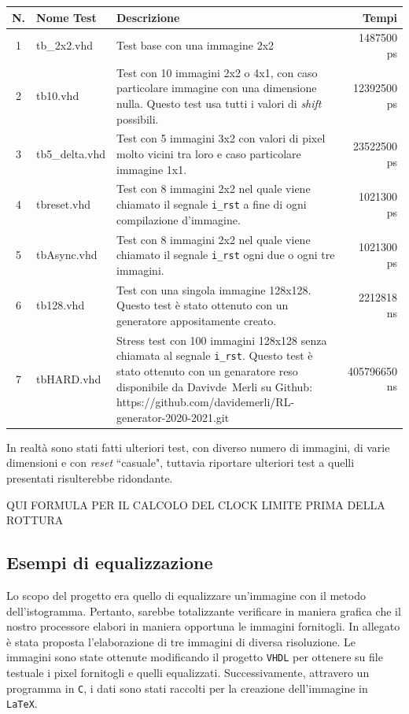\documentclass[11pt, a4paper]{article}
\begin{document}
\begin{center}
  \begin{tabular}{|c|l|p{8.5cm}|r|}
    \hline
    N. &Nome Test & Descrizione & Tempi\\
    \hline
    1 & tb\_2x2.vhd & Test base con una immagine 2x2 & 1487500 ps \\
    \hline
    2 & tb10.vhd & Test con 10 immagini 2x2 o 4x1, con caso particolare immagine con una dimensione nulla. Questo test usa tutti i valori di \textit{shift} possibili.&12392500 ps\\
    \hline
    3 & tb5\_delta.vhd & Test con 5 immagini 3x2 con valori di pixel molto vicini tra loro e caso particolare immagine 1x1. & 23522500 ps\\
    \hline
    4 & tbreset.vhd & Test con 8 immagini 2x2 nel quale viene chiamato il segnale \texttt{i\_rst} a fine di ogni compilazione d'immagine. & 1021300 ps\\
    \hline
    5 & tbAsync.vhd & Test con 8 immagini 2x2 nel quale viene chiamato il segnale \texttt{i\_rst} ogni due o ogni tre immagini. & 1021300 ps\\
    \hline
    6& tb128.vhd & Test con una singola immagine 128x128. Questo test è stato ottenuto con un generatore appositamente creato. & 2212818 ns\\
    \hline
    7 & tbHARD.vhd & Stress test con 100 immagini 128x128 senza chiamata al segnale \texttt{i\_rst}. Questo test è stato ottenuto con un genaratore reso disponibile da \mbox{Davivde Merli} su Github: https://github.com/davidemerli/RL-generator-2020-2021.git & 405796650 ns\\
    \hline
  \end{tabular}
\end{center}
In realtà sono stati fatti ulteriori test, con diverso numero di immagini, di varie dimensioni e con \textit{reset} ``casuale", tuttavia riportare ulteriori test a quelli presentati risulterebbe ridondante.

QUI FORMULA PER IL CALCOLO DEL CLOCK LIMITE PRIMA DELLA ROTTURA
\pagebreak

\subsection{Esempi di equalizzazione}
Lo scopo del progetto era quello di equalizzare un'immagine con il metodo dell'istogramma. Pertanto, sarebbe totalizzante verificare in maniera grafica che il nostro processore elabori in maniera opportuna le immagini fornitogli. In allegato è stata proposta l'elaborazione di tre immagini di diversa risoluzione. Le immagini sono state ottenute modificando il progetto \texttt{VHDL} per ottenere su file testuale i pixel fornitogli e quelli equalizzati. Successivamente, attravero un programma in \texttt{C}, i dati sono stati raccolti per la creazione dell'immagine in \texttt{LaTeX}.\\
\end{document}
